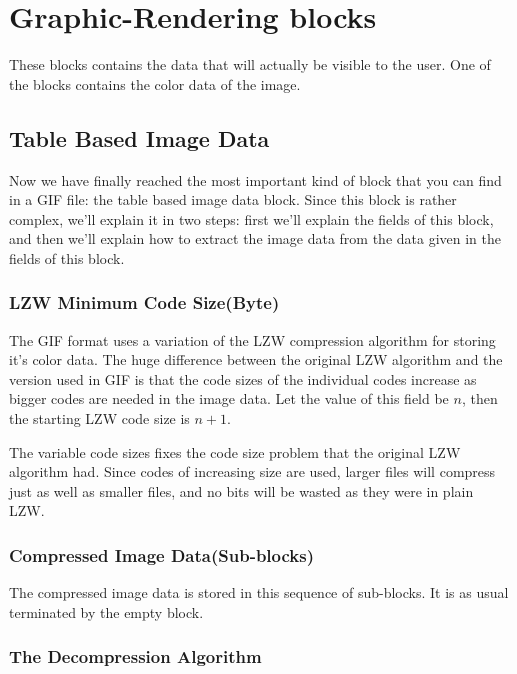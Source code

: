 \section{Graphic-Rendering blocks}

These blocks contains the data that will actually be visible to the
user. One of the blocks contains the color data of the image.

\subsection{Table Based Image Data}

Now we have finally reached the most important kind of block that you
can find in a GIF file: the table based image data block. Since this
block is rather complex, we'll explain it in two steps: first we'll
explain the fields of this block, and then we'll explain how to
extract the image data from the data given in the fields of this
block.

\subsubsection{LZW Minimum Code Size(Byte)}

The GIF format uses a variation of the LZW compression algorithm
for storing it's color data. The huge difference between the
original LZW algorithm and the version used in GIF is that the
code sizes of the individual codes increase as bigger codes are
needed in the image data.  Let the value of this field be $n$, then
the starting LZW code size is $n + 1$.

The variable code sizes fixes the code size problem that the original
LZW algorithm had. Since codes of increasing size are used, larger
files will compress just as well as smaller files, and no bits will be
wasted as they were in plain LZW.

\subsubsection{Compressed Image Data(Sub-blocks)}

The compressed image data is stored in this sequence of sub-blocks. It
is as usual terminated by the empty block.

\subsubsection{The Decompression Algorithm}

